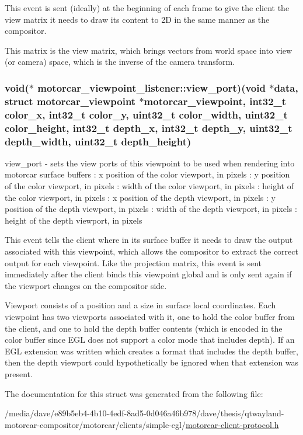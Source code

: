 This event is sent (ideally) at the beginning of each frame to give the client the view matrix it needs to draw its content to 2\-D in the same manner as the compositor.

This matrix is the view matrix, which brings vectors from world space into view (or camera) space, which is the inverse of the camera transform. \hypertarget{structmotorcar__viewpoint__listener_a0b3a306b14550df2000169a8984d925f}{
\subsubsection[{view\-\_\-port}]{\setlength{\rightskip}{0pt plus 5cm}void($\ast$ motorcar\-\_\-viewpoint\-\_\-listener\-::view\-\_\-port)(void $\ast$data, struct motorcar\-\_\-viewpoint $\ast$motorcar\-\_\-viewpoint, int32\-\_\-t color\-\_\-x, int32\-\_\-t color\-\_\-y, uint32\-\_\-t color\-\_\-width, uint32\-\_\-t color\-\_\-height, int32\-\_\-t depth\-\_\-x, int32\-\_\-t depth\-\_\-y, uint32\-\_\-t depth\-\_\-width, uint32\-\_\-t depth\-\_\-height)}}\label{structmotorcar__viewpoint__listener_a0b3a306b14550df2000169a8984d925f}
view\-\_\-port -\/ sets the view ports of this viewpoint to be used when rendering into motorcar surface buffers \-: x position of the color viewport, in pixels \-: y position of the color viewport, in pixels \-: width of the color viewport, in pixels \-: height of the color viewport, in pixels \-: x position of the depth viewport, in pixels \-: y position of the depth viewport, in pixels \-: width of the depth viewport, in pixels \-: height of the depth viewport, in pixels

This event tells the client where in its surface buffer it needs to draw the output associated with this viewpoint, which allows the compositor to extract the correct output for each viewpoint. Like the projection matrix, this event is sent immediately after the client binds this viewpoint global and is only sent again if the viewport changes on the compositor side.

Viewport consists of a position and a size in surface local coordinates. Each viewpoint has two viewports associated with it, one to hold the color buffer from the client, and one to hold the depth buffer contents (which is encoded in the color buffer since E\-G\-L does not support a color mode that includes depth). If an E\-G\-L extension was written which creates a format that includes the depth buffer, then the depth viewport could hypothetically be ignored when that extension was present. 

The documentation for this struct was generated from the following file\-:\begin{DoxyCompactItemize}
\item 
/media/dave/e89b5eb4-\/4b10-\/4edf-\/8ad5-\/0d046a46b978/dave/thesis/qtwayland-\/motorcar-\/compositor/motorcar/clients/simple-\/egl/\hyperlink{clients_2simple-egl_2motorcar-client-protocol_8h}{motorcar-\/client-\/protocol.\-h}\end{DoxyCompactItemize}
